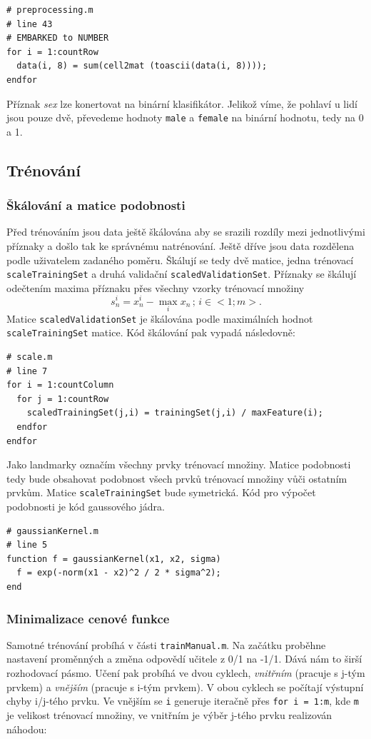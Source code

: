 \documentclass[a4]{article}
\begin{document}
\begin{lstlisting}
# preprocessing.m
# line 43 
# EMBARKED to NUMBER
for i = 1:countRow
  data(i, 8) = sum(cell2mat (toascii(data(i, 8))));
endfor
\end{lstlisting}

\noindent Příznak \textit{sex} lze konertovat na binární klasifikátor. Jelikož víme, že pohlaví u lidí jsou pouze dvě, převedeme hodnoty \texttt{male} a \texttt{female} na binární hodnotu, tedy na 0 a 1.

\subsection{Trénování}
\subsubsection{Škálování a matice podobnosti}
Před trénováním jsou data ještě škálována aby se srazili rozdíly mezi jednotlivými příznaky a došlo tak ke správnému natrénování. Ještě dříve jsou data rozdělena podle uživatelem zadaného poměru. Škálují se tedy dvě matice, jedna trénovací \texttt{scaleTrainingSet} a druhá validační \texttt{scaledValidationSet}. Příznaky se škálují odečtením maxima příznaku přes všechny vzorky trénovací množiny
$$
s_{n}^{i} = x_{n}^{i} - \max_{i} x_{n} \,;\, i \in <1;m>.
$$
\noindent Matice \texttt{scaledValidationSet} je škálována podle maximálních hodnot\\\texttt{scaleTrainingSet} matice. Kód škálování pak vypadá následovně:
\newpage
\begin{lstlisting}
# scale.m
# line 7 
for i = 1:countColumn
  for j = 1:countRow
    scaledTrainingSet(j,i) = trainingSet(j,i) / maxFeature(i);
  endfor
endfor 
\end{lstlisting}

\noindent Jako landmarky označím všechny prvky trénovací množiny. Matice podobnosti tedy bude obsahovat podobnost všech prvků trénovací množiny vůči ostatním prvkům. Matice \texttt{scaleTrainingSet} bude symetrická. Kód pro výpočet podobnosti je kód gaussového jádra.

\begin{lstlisting}
# gaussianKernel.m
# line 5
function f = gaussianKernel(x1, x2, sigma)
  f = exp(-norm(x1 - x2)^2 / 2 * sigma^2); 
end
\end{lstlisting}

\subsubsection{Minimalizace cenové funkce}
Samotné trénování probíhá v části \texttt{trainManual.m}. Na začátku proběhne nastavení proměnných a změna odpovědí učitele z 0/1 na -1/1. Dává nám to širší rozhodovací pásmo. Učení pak probíhá ve dvou cyklech, \textit{vnitřním} (pracuje s j-tým prvkem) a \textit{vnějším} (pracuje s i-tým prvkem). V obou cyklech se počítají výstupní chyby i/j-tého prvku. Ve vnějším se \texttt{i} generuje iteračně přes \texttt{for i = 1:m}, kde \texttt{m} je velikost trénovací množiny, ve vnitřním je výběr j-tého prvku realizován náhodou:
\end{document}
